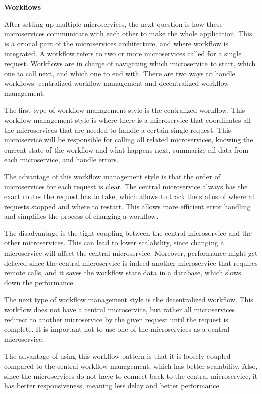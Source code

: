 \noindent \textbf{Workflows}

After setting up multiple microservices, the next question is how these microservices communicate with each other
to make the whole application. This is a crucial part of the microservices architecture,
and where workflow is integrated.
A workflow refers to two or more microservices called for a single request.
Workflows are in charge of navigating which microservice to start, which one to call next, and which one to end with.
There are two ways to handle workflows: centralized workflow management and decentralized workflow management.


The first type of workflow management style is the centralized workflow. This workflow management style is where there is a microservice that coordinates all the microservices that are needed to handle a
certain single request. This microservice will be responsible for calling all related microservices, knowing the current state of the
workflow and what happens next, summarize all data from each microservice, and handle errors.

The advantage of this workflow management style is that the order of microservices for each request is clear.
The central microservice always has the exact routes the request has to take, which allows to track the status of where all requests stopped and where to restart.
This allows more efficient error handling and simplifies the process of changing a workflow.

The disadvantage is the tight coupling between the central microservice and the other microservices.
This can lead to lower scalability, since changing a microservice will affect the central microservice.
Moreover, performance might get delayed since the central microservice is indeed another microservice that requires remote calls, 
and it saves the workflow state data in a database, which slows down the performance. 


The next type of workflow management style is the decentralized workflow. This workflow does not have a central microservice,
but rather all microservices redirect to another microservice
by the given request until the request is complete. It is important not to use one of the microservices as a central microservice.

The advantage of using this workflow pattern is that it is loosely coupled compared to the central workflow management,
which has better scalability. Also, since the microservices do not have to connect back to the central microservice,
it has better responsiveness, meaning less delay and better performance.

